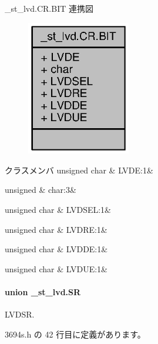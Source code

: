 \+\_\+st\+\_\+lvd.\+C\+R.\+B\+I\+T 連携図
\nopagebreak
\begin{figure}[H]
\begin{center}
\leavevmode
\includegraphics[width=128pt]{da/da8/struct__st__lvd_8CR_8BIT__coll__graph}
\end{center}
\end{figure}
\begin{DoxyFields}{クラスメンバ}
unsigned char\label{3694s_8h_af49227651b536ee5ed8c93ad0792851b}
&
L\+V\+D\+E\+:1&
\\
\hline

unsigned\label{3694s_8h_aa87deb01c5f539e6bda34829c8ef2368}
&
char\+:3&
\\
\hline

unsigned char\label{3694s_8h_a0f4b7a338b8e2742b8f7a3af3d2e6c0f}
&
L\+V\+D\+S\+E\+L\+:1&
\\
\hline

unsigned char\label{3694s_8h_ae75749fd797bcd2d3285e814df04a800}
&
L\+V\+D\+R\+E\+:1&
\\
\hline

unsigned char\label{3694s_8h_a1b0c891c360c0ef30c21050b823f7748}
&
L\+V\+D\+D\+E\+:1&
\\
\hline

unsigned char\label{3694s_8h_a15fe1377e4b6ba1e69208bf4b1c42814}
&
L\+V\+D\+U\+E\+:1&
\\
\hline

\end{DoxyFields}
\label{union__st__lvd_8SR}
\paragraph{union \+\_\+st\+\_\+lvd.\+S\+R}
L\+V\+D\+S\+R. 

 3694s.\+h の 42 行目に定義があります。




